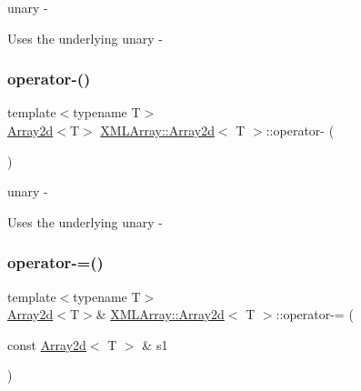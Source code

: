 unary -\/ 

Uses the underlying unary -\/ \mbox{\label{classXMLArray_1_1Array2d_a650034573254ebdd7c914d68a498e2c9}} 
\subsubsection{\texorpdfstring{operator-\/()}{operator-()}\hspace{0.1cm}{\footnotesize\ttfamily [2/2]}}
{\footnotesize\ttfamily template$<$typename T$>$ \\
\mbox{\hyperlink{classXMLArray_1_1Array2d}{Array2d}}$<$T$>$ \mbox{\hyperlink{classXMLArray_1_1Array2d}{X\+M\+L\+Array\+::\+Array2d}}$<$ T $>$\+::operator-\/ (\begin{DoxyParamCaption}{ }\end{DoxyParamCaption})\hspace{0.3cm}{\ttfamily [inline]}}



unary -\/ 

Uses the underlying unary -\/ \mbox{\label{classXMLArray_1_1Array2d_aaeb259530dba3f189e129c935391d92a}} 
\subsubsection{\texorpdfstring{operator-\/=()}{operator-=()}\hspace{0.1cm}{\footnotesize\ttfamily [1/2]}}
{\footnotesize\ttfamily template$<$typename T$>$ \\
\mbox{\hyperlink{classXMLArray_1_1Array2d}{Array2d}}$<$T$>$\& \mbox{\hyperlink{classXMLArray_1_1Array2d}{X\+M\+L\+Array\+::\+Array2d}}$<$ T $>$\+::operator-\/= (\begin{DoxyParamCaption}\item[{const \mbox{\hyperlink{classXMLArray_1_1Array2d}{Array2d}}$<$ T $>$ \&}]{s1 }\end{DoxyParamCaption})\hspace{0.3cm}{\ttfamily [inline]}}



